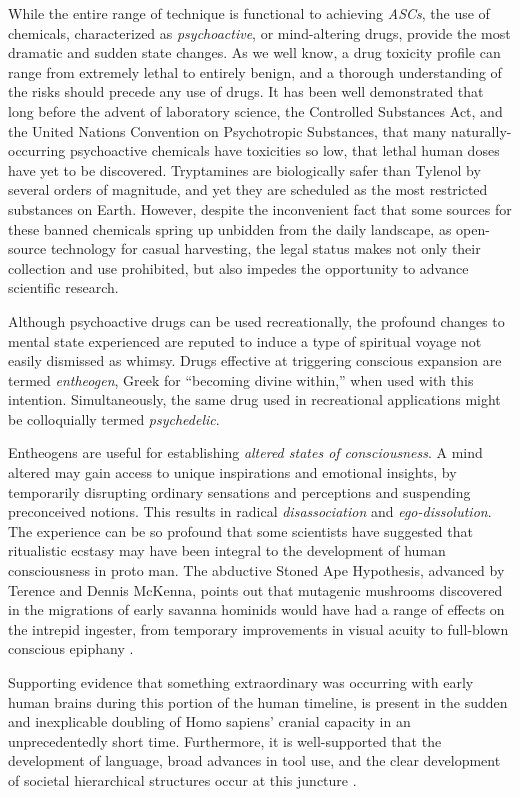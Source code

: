 \documentclass{UIdahoMastersThesis}
\begin{document}
While the entire range of technique is functional to achieving \textit{\acp{ASC}}, the use of chemicals, characterized as \textit{psychoactive}, or mind-altering drugs, provide the most dramatic and sudden state changes. As we well know, a drug toxicity profile can range from extremely lethal to entirely benign, and a thorough understanding of the risks should precede any use of drugs. It has been well demonstrated that long before the advent of laboratory science, the Controlled Substances Act, and the United Nations Convention on Psychotropic Substances, that many naturally-occurring psychoactive chemicals have toxicities so low, that lethal human doses have yet to be discovered. Tryptamines are biologically safer than Tylenol by several orders of magnitude, and yet they are scheduled as the most restricted substances on Earth. However, despite the inconvenient fact that some sources for these banned chemicals spring up unbidden from the daily landscape, as open-source technology for casual harvesting, the legal status makes not only their collection and use prohibited, but also impedes the opportunity to advance scientific research.

Although psychoactive drugs can be used recreationally, the profound changes to mental state experienced are reputed to induce a type of spiritual voyage not easily dismissed as whimsy. Drugs effective at triggering conscious expansion are termed \textit{entheogen}, Greek for ``becoming divine within,'' when used with this intention. Simultaneously, the same drug used in recreational applications might be colloquially termed \textit{psychedelic}.

Entheogens are useful for establishing \textit{altered states of consciousness}. A mind altered may gain access to unique inspirations and emotional insights, by temporarily disrupting ordinary sensations and perceptions and suspending preconceived notions. This results in radical \textit{disassociation} and \textit{ego-dissolution}. The experience can be so profound that some scientists have suggested that ritualistic ecstasy may have been integral to the development of human consciousness in proto man. The abductive Stoned Ape Hypothesis, advanced by Terence and Dennis McKenna, points out that mutagenic mushrooms discovered in the migrations of early savanna hominids would have had a range of effects on the intrepid ingester, from temporary improvements in visual acuity to full-blown conscious epiphany \cite{mckenna_invisible_1993}.

Supporting evidence that something extraordinary was occurring with early human brains during this portion of the human timeline, is present in the sudden and inexplicable doubling of Homo sapiens' cranial capacity in an unprecedentedly short time. Furthermore, it is well-supported that the development of language, broad advances in tool use, and the clear development of societal hierarchical structures occur at this juncture \cite{mckenna_food_1992}.
\end{document}
